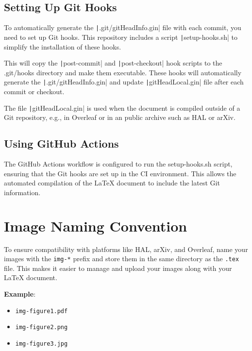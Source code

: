 \documentclass[a4paper]{article}
\begin{document}
\subsection{Setting Up Git Hooks}

To automatically generate the \texttt|.git/gitHeadInfo.gin| file with each commit, you need to set up Git hooks. 
This repository includes a script \texttt|setup-hooks.sh| to simplify the installation of these hooks.

This will copy the \texttt|post-commit| and \texttt|post-checkout| hook scripts to the .git/hooks directory and make them executable. 
These hooks will automatically generate the \texttt|.git/gitHeadInfo.gin| and update \texttt|gitHeadLocal.gin| file after each commit or checkout.

The file \texttt|gitHeadLocal.gin| is used when the document is compiled outside of a Git repository, e.g., in Overleaf or in an public archive such as HAL or arXiv.





\subsection{Using GitHub Actions}

The GitHub Actions workflow is configured to run the setup-hooks.sh script, ensuring that the Git hooks are set up in the CI environment. This allows the automated compilation of the LaTeX document to include the latest Git information.


\section{Image Naming Convention}

To ensure compatibility with platforms like HAL, arXiv, and Overleaf, name your images with the \texttt{img-*} prefix and store them in the same directory as the \texttt{.tex} file. 
This makes it easier to manage and upload your images along with your LaTeX document.

\textbf{Example}:
\begin{itemize}
    \item \texttt{img-figure1.pdf}
    \item \texttt{img-figure2.png}
    \item \texttt{img-figure3.jpg}
\end{itemize}
\end{document}
